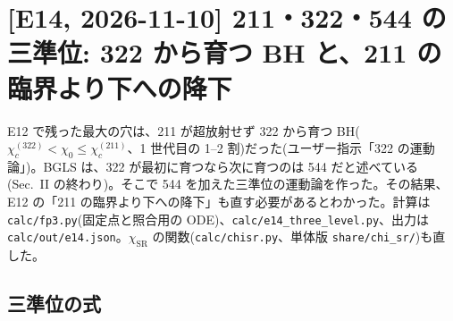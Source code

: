 \section{[E14, 2026-11-10] 211・322・544 の三準位: 322 から育つ BH と、211 の臨界より下への降下}\label{sec:e14}

E12 で残った最大の穴は、211 が超放射せず 322 から育つ BH($\chi_c^{(322)}<\chi_0\le\chi_c^{(211)}$、1 世代目の 1--2 割)だった(ユーザー指示「322 の運動論」)。BGLS は、322 が最初に育つなら次に育つのは 544 だと述べている(Sec.~II の終わり)。そこで 544 を加えた三準位の運動論を作った。その結果、E12 の「211 の臨界より下への降下」も直す必要があるとわかった。計算は \texttt{calc/fp3.py}(固定点と照合用の ODE)、\texttt{calc/e14\_three\_level.py}、出力は \texttt{calc/out/e14.json}。$\chi_\mathrm{SR}$ の関数(\texttt{calc/chisr.py}、単体版 \texttt{share/chi\_sr/})も直した。

\subsection{三準位の式}

